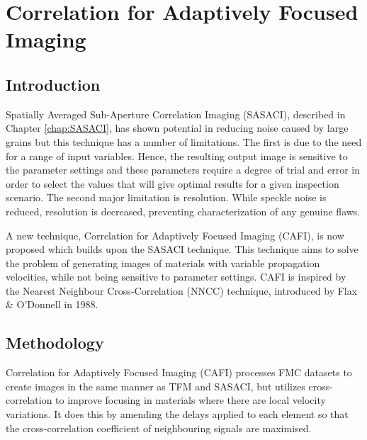 \chapter{Correlation for Adaptively Focused Imaging}\label{chap:CAFI}

\graphicspath{{CAFI/Images/}{CAFI/Images/EPS/}{CAFI/Images/Results/}}

\section{Introduction}
Spatially Averaged Sub-Aperture Correlation Imaging (SASACI), described in Chapter \ref{chap:SASACI}, has shown potential in reducing noise caused by large grains\cite{lardner_new_2013} but this technique has a number of limitations. The first is due to the need for a range of input variables. Hence, the resulting output image is sensitive to the parameter settings and these parameters require a degree of trial and error in order to select the values that will give optimal results for a given inspection scenario. The second major limitation is resolution. While speckle noise is reduced, resolution is decreased, preventing characterization of any genuine flaws.

A new technique, Correlation for Adaptively Focused Imaging (CAFI), is now proposed which builds upon the SASACI technique\cite{lardner_using_2014}. This technique aims to solve the problem of generating images of materials with variable propagation velocities, while not being sensitive to parameter settings. CAFI is inspired by the Nearest Neighbour Cross-Correlation (NNCC) technique, introduced by Flax \& O'Donnell in 1988\cite{flax_phase-aberration_1988}.


\section{Methodology}
Correlation for Adaptively Focused Imaging (CAFI) processes FMC datasets to create images in the same manner as TFM and SASACI, but utilizes cross-correlation to improve focusing in materials where there are local velocity variations. It does this by amending the delays applied to each element so that the cross-correlation coefficient of neighbouring signals are maximised.

